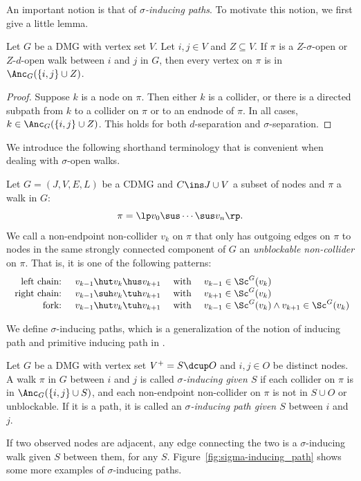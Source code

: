 An important notion is that of \emph{$\sigma$-inducing paths}.
To motivate this notion, we first give a little lemma.
\begin{Lem}\label{lem:ancestral_relations_open_path}
  Let $G$ be a DMG with vertex set $V$. Let $i, j \in V$ and $Z \subseteq V$.
  If $\pi$ is a $Z$-$\sigma$-open or $Z$-$d$-open walk between $i$ and $j$ in $G$, then every vertex on $\pi$ is in $\Anc_G(\{i,j\} \cup Z)$.
\end{Lem}
\begin{proof}
  Suppose $k$ is a node on $\pi$. 
  Then either $k$ is a collider, or there is a directed subpath from $k$ to a collider on $\pi$ or to an endnode of $\pi$. 
  In all cases, $k \in \Anc_G(\{i,j\}\cup Z)$.
  This holds for both $d$-separation and $\sigma$-separation.
\end{proof}

We introduce the following shorthand terminology that is convenient when dealing with $\sigma$-open walks.
\begin{Def}\label{def:unblockable_noncollider}
  Let $G=(J,V,E,L)$ be a CDMG and $C \ins J \cup V$ a subset of nodes and $\pi$ a walk in $G$:
  \[ \pi =\lp  v_0 \sus \cdots \sus v_n \rp.  \]
  We call a non-endpoint non-collider $v_k$ on $\pi$ that only has outgoing edges on $\pi$ to nodes in the same strongly connected component of $G$ an \emph{unblockable non-collider} on $\pi$. 
  That is, it is one of the following patterns:
  \[\begin{array}{rccl}
    \text{ left chain: } & v_{k-1} \hut v_k \hus v_{k+1} & \text{ with } & v_{k-1} \in \Sc^G(v_{k})\\
    \text{ right chain: } & v_{k-1} \suh v_k \tuh v_{k+1} & \text{ with } & v_{k+1} \in \Sc^G(v_{k})\\
    \text{ fork: } & v_{k-1} \hut v_k \tuh v_{k+1} & \text{ with } & v_{k-1} \in \Sc^G(v_k) \land v_{k+1} \in \Sc^G(v_k)
  \end{array}\]
\end{Def}

We define $\sigma$-inducing paths, which is a generalization of the notion of inducing path \cite{VermaPearl1990} and primitive inducing path in \cite{RichardsonSpirtes02}.
\begin{Def}\label{def:sigma-inducing_path}
  Let $G$ be a DMG with vertex set $V^+ = S \dcup O$ and $i,j \in O$ be distinct nodes.
  A walk $\pi$ in $G$ between $i$ and $j$ is called \emph{$\sigma$-inducing given $S$} if each
  collider on $\pi$ is in $\Anc_{G}(\{i,j\}\cup S)$,
  and each non-endpoint non-collider on $\pi$ is not in $S \cup O$  or unblockable.
  If it is a path, it is called an \emph{$\sigma$-inducing path given $S$} between $i$ and $j$.
\end{Def}
If two observed nodes are adjacent, any edge connecting the two is a $\sigma$-inducing walk given $S$ between them, for any $S$.
Figure~\ref{fig:sigma-inducing_path} shows some more examples of $\sigma$-inducing paths.

